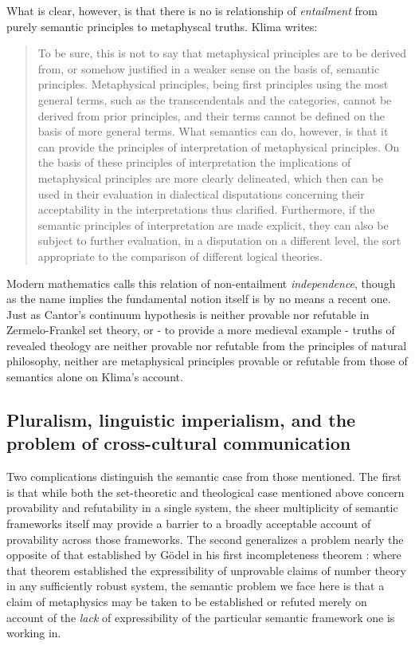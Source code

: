 \documentclass[]{article}
\begin{document}
What is clear, however, is that there is no is relationship of \emph{entailment} from purely semantic principles to metaphyscal truths. Klima writes: 
\begin{quote}
To be sure, this is not to say that metaphysical principles are to be derived from, or somehow justified 
in a weaker sense on the basis of, semantic principles. Metaphysical principles, being first principles 
using the most general terms, such as the transcendentals and the categories, cannot be derived from 
prior principles, and their terms cannot be defined on the basis of more general terms. What 
semantics can do, however, is that it can provide the principles of interpretation of metaphysical 
principles. On the basis of these principles of interpretation the implications of metaphysical 
principles are more clearly delineated, which then can be used in their evaluation in dialectical 
disputations concerning their acceptability in the interpretations thus clarified. Furthermore, if the 
semantic principles of interpretation are made explicit, they can also be subject to further evaluation, 
in a disputation on a different level, the sort appropriate to the comparison of different logical 
theories.  \autocite[49]{Klima2011b}
\end{quote}

Modern mathematics calls this relation of non-entailment \emph{independence}, 
though as the name implies the fundamental notion itself is by no means a recent one. 
Just as Cantor's continuum hypothesis is neither provable nor refutable in Zermelo-Frankel set theory, 
or - to provide a more medieval example - 
truths of revealed theology are neither provable nor refutable from the principles of natural philosophy, 
neither are metaphysical principles provable or refutable from those of semantics alone on Klima's account. 

\subsection{Pluralism, linguistic imperialism, and the problem of cross-cultural communication}
Two complications distinguish the semantic case from those mentioned. 
The first is that while both the set-theoretic and theological case mentioned above concern provability and refutability in a single system, 
the sheer multiplicity of semantic frameworks itself may provide a barrier to a broadly acceptable account of provability across those frameworks. 
The second generalizes a problem nearly the opposite of that established by G\"{o}del in his first incompleteness theorem \autocite{Godel1931}:
where that theorem established the expressibility of unprovable claims of number theory in any sufficiently robust system, 
the semantic problem we face here is that a claim of metaphysics may be taken to be established or refuted merely on account of the \emph{lack} of expressibility of the particular semantic framework one is working in. 
\end{document}
